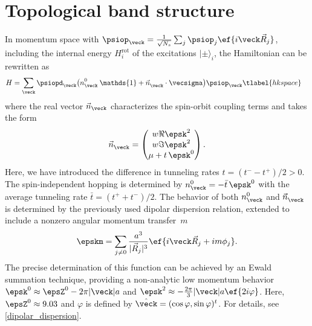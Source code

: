\section{Topological band structure}
In momentum space with $\psiop_{\veck}=\frac{1}{\sqrt{N_s}}\sum_{j} \psiop_{j}\ef{i\veck\vec{R}_j}$, including the internal energy $H_{i}^{\text{rot}}$ of the excitations $|\pm\rangle_{i}$, the Hamiltonian  can be rewritten as
\begin{align}
    H &= \sum_{\veck} \psiopd_{\veck} \big({n^{0\vphantom\dagger}_{\veck} \: \mathds{1} + \vec{n}^{\vphantom \dagger}_{\veck}\cdot\vecsigma}\big) \psiop_{\veck}
    \tlabel{hkspace}
\end{align}
where the real vector $\vec{n}_\veck$ characterizes the spin-orbit coupling terms and takes the form
\begin{align}
    \vec{n}^{\vphantom 0}_{\veck} = \begin{pmatrix}
        w \Re \epsk^2 \\
        w \Im \epsk^2 \\
        \mu + t\, \epsk^0
    \end{pmatrix}.
\end{align}
Here, we have introduced the difference in tunneling rates $t = (t^--t^+)/2 > 0$.
The spin-independent hopping is determined by $n^0_{\veck} = -\bar{t}\, \epsk^0$ with the average tunneling rate ${\bar t} = (t^{+}+t^{-})/2$.
The behavior of both $n^0_\veck$ and $\vec{n}^{\vphantom 0}_\veck$ is determined by the previously used dipolar dispersion relation, extended to include a nonzero angular momentum transfer~$m$~\cite{Muller2010,Peter2012b,Syzranov2014,Peter2014}
\begin{align}
    \epskm = \sum_{j\ne 0} \frac{a^3}{|\vec{R}_j|^3}\ef{i\veck \vec{R}_j + i m \phi_{j}}.
\end{align}
The precise determination of this function can be achieved by an Ewald summation technique, providing a non-analytic low momentum behavior
$\epsk^0 \approx \epsZ^0 - 2\pi |\veck|a$ and
$\epsk^2 \approx -\frac{2\pi}{3} |\veck|a \ef{2i \varphi}$.
Here, $\epsZ^0 \approx 9.03$ and $\varphi$ is defined by $\hat{\veck}=(\cos \varphi, \sin \varphi)^t$.
For details, see \cref{dipolar_dispersion}.


